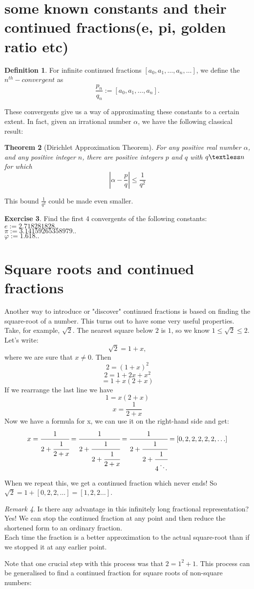 \documentclass[12pt]{amsart}
\newtheorem{theorem}{Theorem}[section]
\theoremstyle{definition}
\newtheorem{defn}[theorem]{Definition}
\newtheorem{xca}[theorem]{Exercise}
\theoremstyle{remark}
\newtheorem{rmk}[theorem]{Remark}
\numberwithin{equation}{section}
\begin{document}
\section{some known constants and their continued fractions(e, pi, golden ratio etc)}
\begin{defn}
For infinite continued fractions $[a_0,a_1,\ldots, a_n,\ldots]$, we define the $n^{th}-convergent$ as \[\frac{p_n}{q_n}:=[a_0,a_1,\ldots, a_n].\]
\end{defn}
These convergents give us a way of approximating these constants to a certain extent. In fact, given an irrational number $\alpha$, we have the following classical result:
\begin{theorem} [Dirichlet Approximation Theorem]
For any positive real number $\alpha$, and any positive integer $n$, there are positive integers $p$ and $q$ with $q \textless n$ for which
\[\left| \alpha-\frac{p}{q}\right|\leq \frac{1}{q^2}\]
\end{theorem}
This bound $\frac{1}{q^2}$ could be made even smaller. 
\begin{xca}
Find the first 4 convergents of the following constants: 
$e:=2.718281828..$\\
$\pi:=3.14159265358979..$\\
$\varphi:=1.618..$
\end{xca}



\section{Square roots and continued fractions}

Another way to introduce or "discover" continued fractions is based on finding the square-root of a number. This turns out to have some very useful properties.
Take, for example, $\sqrt{2}$. The nearest square below $2$ is $1$, so we know $1\le \sqrt{2}\le 2$. Let's write:
\[\sqrt{2} = 1 + x,\] where we are sure that $x\neq 0$. Then
\[2 = (1 + x)^2\]
 \[2  = 1 + 2x + x^2\]
 \[  =1 + x( 2 + x)\]
If we rearrange the last line we have
\[1 = x(2 + x)\]
\[ x = \frac{1}{2 + x} \]
Now we have a formula for x, we can use it on the right-hand side and get:
$$ x = \cfrac{1}{2 + \cfrac{1}{2 + x}}=\cfrac{1}{2 + \cfrac{1}{2 + \cfrac{1}{2 + x}}}=\cfrac{1}{{2 + \cfrac{1}{2 + \cfrac{1}{4 \ddots}}}}=[0,2,2,2,2,2,\ldots] $$ 

When we repeat this, we get a continued fraction which never ends!
So $\sqrt{2}=1+[0,2,2,\ldots]= [1,2,2\ldots]$.
\begin{rmk}
 Is there any advantage in this infinitely long fractional representation? Yes! We can stop the continued fraction at any point and then reduce the shortened form to an ordinary fraction.\\ Each time the fraction is a better approximation to the actual square-root than if we stopped it at any earlier point.
\end{rmk}
Note that one crucial step with this process was that $2=1^2+1$. This process can be generalised to find a continued fraction for square roots of non-square numbers:
\end{document}
